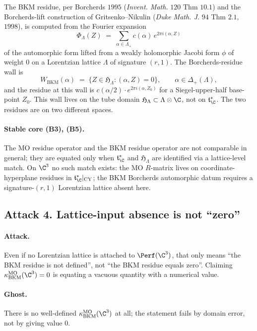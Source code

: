 The BKM residue, per Borcherds $1995$ (\textit{Invent. Math.} $120$
Thm $10.1$) and the Borcherds-lift construction of Gritsenko--Nikulin
(\textit{Duke Math. J.} $94$ Thm $2.1$, $1998$), is computed from
the Fourier expansion
\[
 \Phi_\Lambda(Z) \;=\; \sum_{\alpha \in \Lambda_+} c(\alpha) \,
 e^{2\pi i (\alpha, Z)}
\]
of the automorphic form lifted from a weakly holomorphic Jacobi form
$\phi$ of weight $0$ on a Lorentzian lattice $\Lambda$ of signature
$(r, 1)$. The Borcherds-residue wall is
\[
 W_{\mathrm{BKM}}(\alpha) \;=\; \{Z \in \mathfrak H_\Lambda :
 (\alpha, Z) = 0\}, \qquad \alpha \in \Delta_+(\Lambda),
\]
and the residue at this wall is $c(\alpha/2) \cdot e^{2\pi i
(\alpha, Z_0)}$ for a Siegel-upper-half base-point $Z_0$. This wall
lives on the tube domain $\mathfrak H_\Lambda \subset \Lambda \otimes
\C$, not on $\mathfrak t^*_\C$. The two residues are on two
different spaces.

\paragraph{Stable core (B3), (B5).} The MO residue operator and the
BKM residue operator are not comparable in general; they are equated
only when $\mathfrak t^*_\C$ and $\mathfrak H_\Lambda$ are identified
via a lattice-level match. On $\C^3$ no such match exists: the MO
$R$-matrix lives on coordinate-hyperplane residues in $\mathfrak
t^*_\C|_{\mathrm{CY}}$; the BKM Borcherds automorphic datum requires
a signature-$(r, 1)$ Lorentzian lattice absent here.

\subsection*{Attack 4.  Lattice-input absence is not ``zero''}

\paragraph{Attack.} Even if no Lorentzian lattice is attached to
$\Perf(\C^3)$, that only means ``the BKM residue is not defined'',
not ``the BKM residue equals zero''. Claiming
$\kappa_{\mathrm{BKM}}^{\mathrm{MO}}(\C^3) = 0$ is equating a
vacuous quantity with a numerical value.

\paragraph{Ghost.} There is no well-defined
$\kappa_{\mathrm{BKM}}^{\mathrm{MO}}(\C^3)$ at all; the statement
fails by domain error, not by giving value $0$.

